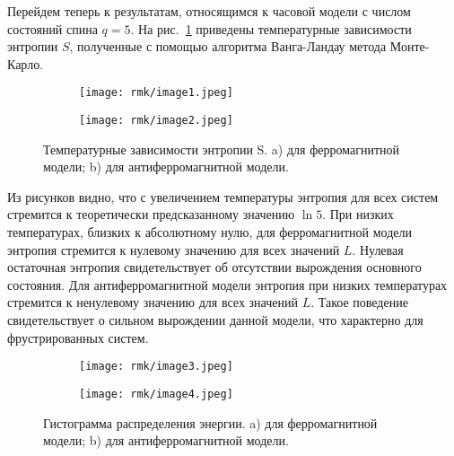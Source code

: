 %
%

Перейдем теперь к результатам, относящимся к часовой модели с числом состояний спина $q = 5$. На рис.~\ref{fig:rmk-1} приведены температурные зависимости энтропии $S$, полученные с помощью алгоритма Ванга-Ландау метода Монте-Карло.

\begin{figure}[ht]
    \centering
    \begin{subfigure}{0.45\textwidth}
        \texttt{[image: rmk/image1.jpeg]}
        \caption{}
    \end{subfigure}
    \begin{subfigure}{0.45\textwidth}
        \texttt{[image: rmk/image2.jpeg]}
        \caption{}
    \end{subfigure}
    \caption{Температурные зависимости энтропии S. a) для ферромагнитной модели; b) для антиферромагнитной модели.}
    \label{fig:rmk-1}
\end{figure}

Из рисунков видно, что с увеличением температуры энтропия для всех систем стремится к теоретически предсказанному значению $\ln 5$. При низких температурах, близких к абсолютному нулю, для ферромагнитной модели энтропия стремится к нулевому значению для всех значений $L$. Нулевая остаточная энтропия свидетельствует об отсутствии вырождения основного состояния. Для антиферромагнитной модели энтропия при низких температурах стремится к ненулевому значению для всех значений $L$. Такое поведение свидетельствует о сильном вырождении данной модели, что характерно для фрустрированных систем.

\begin{figure}[ht]
    \centering
    \begin{subfigure}{0.45\textwidth}
        \texttt{[image: rmk/image3.jpeg]}
        \caption{}
        \label{fig:rmk-2:a}
    \end{subfigure}
    \begin{subfigure}{0.45\textwidth}
        \texttt{[image: rmk/image4.jpeg]}
        \caption{}
        \label{fig:rmk-2:b}
    \end{subfigure}
    \caption{Гистограмма распределения энергии. a) для ферромагнитной модели; b) для антиферромагнитной модели.}
    \label{fig:rmk-2}
\end{figure}

